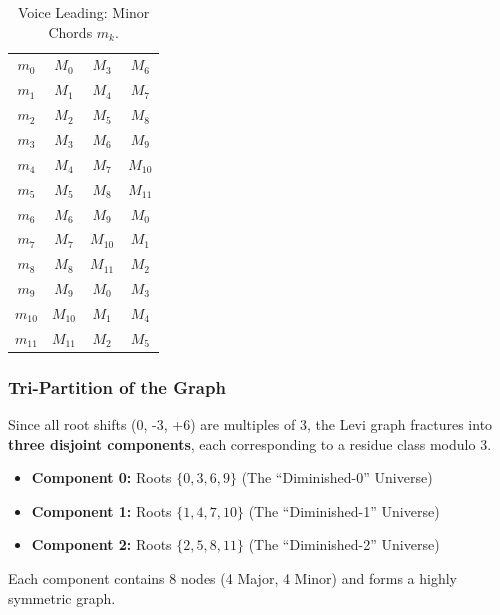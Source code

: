 \documentclass[12pt,letterpaper]{amsart}
\begin{document}
\begin{table}[H]
\begin{minipage}{0.48\textwidth}
\begin{tabular}{|c||c|c|c|}
\hline
$m_0$ & $M_0$ & $M_3$ & $M_6$ \\
$m_1$ & $M_1$ & $M_4$ & $M_7$ \\
$m_2$ & $M_2$ & $M_5$ & $M_{8}$ \\
$m_3$ & $M_3$ & $M_6$ & $M_{9}$ \\
$m_4$ & $M_4$ & $M_7$ & $M_{10}$ \\
$m_5$ & $M_5$ & $M_8$ & $M_{11}$ \\
$m_6$ & $M_6$ & $M_9$ & $M_{0}$ \\
$m_7$ & $M_7$ & $M_{10}$ & $M_{1}$ \\
$m_8$ & $M_8$ & $M_{11}$ & $M_{2}$ \\
$m_9$ & $M_9$ & $M_{0}$ & $M_{3}$ \\
$m_{10}$ & $M_{10}$ & $M_{1}$ & $M_{4}$ \\
$m_{11}$ & $M_{11}$ & $M_{2}$ & $M_{5}$ \\
\hline
\end{tabular}
\caption{Voice Leading: Minor Chords $m_k$.}
\end{minipage}
\end{table}

\subsubsection{Tri-Partition of the Graph}
Since all root shifts (0, -3, +6) are multiples of 3, the Levi graph fractures into \textbf{three disjoint components}, each corresponding to a residue class modulo 3.
\begin{itemize}
    \item \textbf{Component 0:} Roots $\{0, 3, 6, 9\}$ (The ``Diminished-0'' Universe)
    \item \textbf{Component 1:} Roots $\{1, 4, 7, 10\}$ (The ``Diminished-1'' Universe)
    \item \textbf{Component 2:} Roots $\{2, 5, 8, 11\}$ (The ``Diminished-2'' Universe)
\end{itemize}
Each component contains 8 nodes (4 Major, 4 Minor) and forms a highly symmetric graph.
\end{document}
